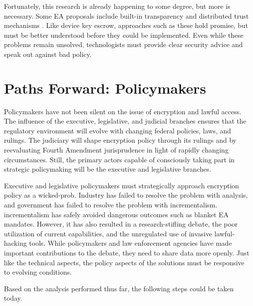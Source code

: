 Fortunately, this research is already happening to some degree, but more is necessary. Some \ac{EA} proposals include
built-in transparency and distributed trust mechanisms \cite{goos_oblivious_1996} \cite{phan_key_2017}
\cite{servan_schreiber_jje_2020}. Like device key escrow, approaches such as these hold promise, but must be better
understood before they could be implemented. Even while these problems remain unsolved, technologists must provide clear
security advice and speak out against bad policy.


\section{Paths Forward: Policymakers}


Policymakers have not been silent on the issue of encryption and lawful access. The influence of the executive,
legislative, and judicial branches ensures that the regulatory environment will evolve with changing federal policies,
laws, and rulings. The judiciary will shape encryption policy through its rulings and by reevaluating Fourth Amendment
jurisprudence in light of rapidly changing circumstances. Still, the primary actors capable of consciously taking part
in strategic policymaking will be the executive and legislative branches.

Executive and legislative policymakers must strategically approach encryption policy as a \ac{wicked-prob}. Industry has
failed to resolve the problem with analysis, and government has failed to resolve the problem with \ac{incrementalism}.
\Ac{incrementalism} has safely avoided dangerous outcomes such as blanket \ac{EA} mandates. However, it has also
resulted in a research-stifling debate, the poor utilization of current capabilities, and the unregulated use of
invasive \ac{lawful-hacking} tools. While policymakers and law enforcement agencies have made important contributions to
the debate, they need to share data more openly. Just like the technical aspects, the policy aspects of the solutions
must be responsive to evolving conditions.

Based on the analysis performed thus far, the following steps could be taken today.

